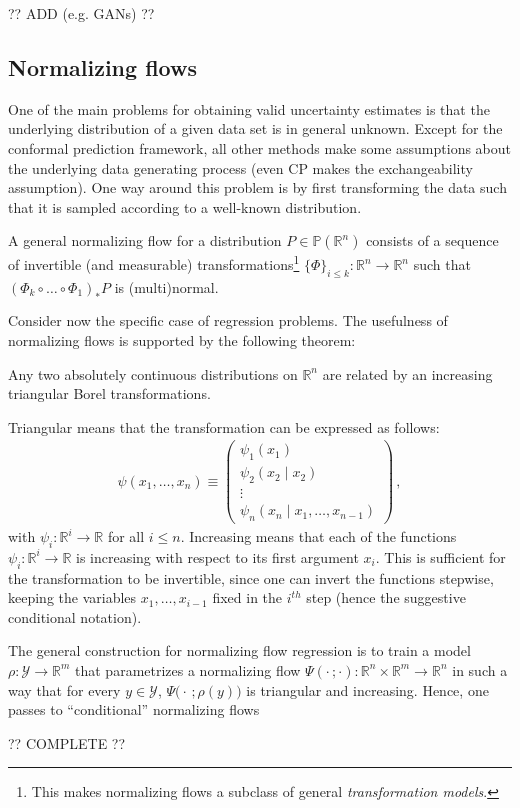     ?? ADD (e.g. GANs) ??

\subsection{Normalizing flows}

    One of the main problems for obtaining valid uncertainty estimates is that the underlying distribution of a given data set is in general unknown. Except for the conformal prediction framework, all other methods make some assumptions about the underlying data generating process (even CP makes the exchangeability assumption). One way around this problem is by first transforming the data such that it is sampled according to a well-known distribution.

    A general normalizing flow for a distribution $P\in\mathbb{P}(\mathbb{R}^n)$ consists of a sequence of invertible (and measurable) transformations\footnote{This makes normalizing flows a subclass of general \textit{transformation models}.} $\{\Phi\}_{i\leq k}:\mathbb{R}^n\rightarrow\mathbb{R}^n$ such that $(\Phi_k\circ\ldots\circ\Phi_1)_*P$ is (multi)normal.

    Consider now the specific case of regression problems. The usefulness of normalizing flows is supported by the following theorem:
    \begin{theorem}[Bogachev et al.]
        Any two absolutely continuous distributions on $\mathbb{R}^n$ are related by an increasing triangular Borel transformations.
    \end{theorem}
    Triangular means that the transformation can be expressed as follows:
    \begin{gather}
        \psi(x_1,\ldots,x_n)\equiv
        \begin{pmatrix}
            \psi_1(x_1)\\
            \psi_2(x_2\mid x_2)\\
            \vdots\\
            \psi_n(x_n\mid x_1,\ldots,x_{n-1})
        \end{pmatrix}\,,
    \end{gather}
    with $\psi_i:\mathbb{R}^i\rightarrow\mathbb{R}$ for all $i\leq n$. Increasing means that each of the functions $\psi_i:\mathbb{R}^i\rightarrow\mathbb{R}$ is increasing with respect to its first argument $x_i$. This is sufficient for the transformation to be invertible, since one can invert the functions stepwise, keeping the variables $x_1,\ldots,x_{i-1}$ fixed in the $i^{th}$ step (hence the suggestive conditional notation).

    The general construction for normalizing flow regression is to train a model $\rho:\mathcal{Y}\rightarrow\mathbb{R}^m$ that parametrizes a normalizing flow $\Psi(\cdot\,;\cdot):\mathbb{R}^n\times\mathbb{R}^m\rightarrow\mathbb{R}^n$ in such a way that for every $y\in\mathcal{Y}$, $\Psi\big(\cdot\,;\rho(y)\big)$ is triangular and increasing. Hence, one passes to ``conditional'' normalizing flows

    ?? COMPLETE ??